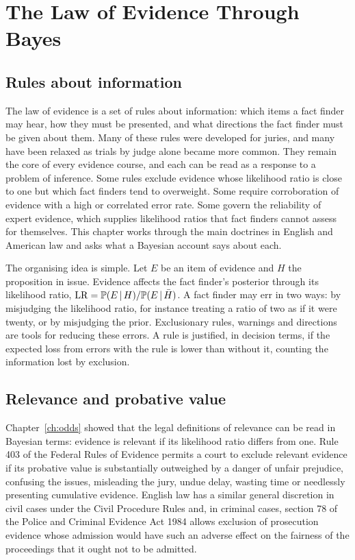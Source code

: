 \chapter{The Law of Evidence Through Bayes}
\label{ch:evidence}

\section{Rules about information}

The law of evidence is a set of rules about information: which items a fact finder may hear, how they must be presented, and what directions the fact finder must be given about them. Many of these rules were developed for juries, and many have been relaxed as trials by judge alone became more common. They remain the core of every evidence course, and each can be read as a response to a problem of inference. Some rules exclude evidence whose likelihood ratio is close to one but which fact finders tend to overweight. Some require corroboration of evidence with a high or correlated error rate. Some govern the reliability of expert evidence, which supplies likelihood ratios that fact finders cannot assess for themselves. This chapter works through the main doctrines in English and American law and asks what a Bayesian account says about each.

The organising idea is simple. Let $E$ be an item of evidence and $H$ the proposition in issue. Evidence affects the fact finder's posterior through its likelihood ratio, $\mathrm{LR} = \mathbb{P}(E\,\vert\, H)/\mathbb{P}(E\,\vert\,\bar H)$. A fact finder may err in two ways: by misjudging the likelihood ratio, for instance treating a ratio of two as if it were twenty, or by misjudging the prior. Exclusionary rules, warnings and directions are tools for reducing these errors. A rule is justified, in decision terms, if the expected loss from errors with the rule is lower than without it, counting the information lost by exclusion.

\section{Relevance and probative value}

Chapter~\ref{ch:odds} showed that the legal definitions of relevance can be read in Bayesian terms: evidence is relevant if its likelihood ratio differs from one. Rule 403 of the Federal Rules of Evidence permits a court to exclude relevant evidence if its probative value is substantially outweighed by a danger of unfair prejudice, confusing the issues, misleading the jury, undue delay, wasting time or needlessly presenting cumulative evidence. English law has a similar general discretion in civil cases under the Civil Procedure Rules and, in criminal cases, section 78 of the Police and Criminal Evidence Act 1984 allows exclusion of prosecution evidence whose admission would have such an adverse effect on the fairness of the proceedings that it ought not to be admitted.

